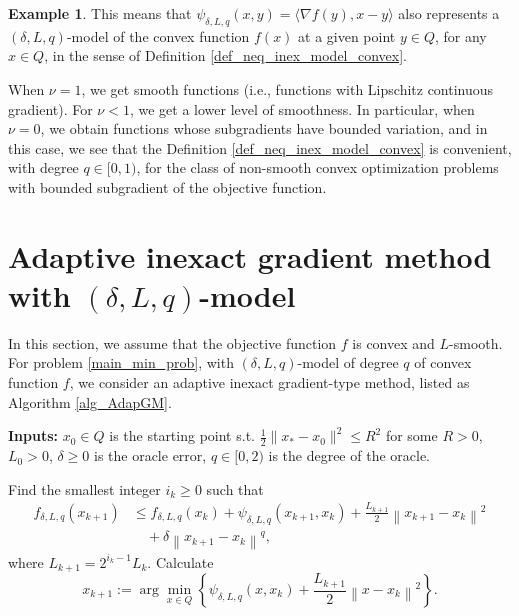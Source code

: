 \documentclass[11pt]{amsart}
\theoremstyle{definition}
\newtheorem{example}[theorem]{Example}
\numberwithin{equation}{section}
\begin{document}
\begin{example}
This means that $\psi_{\delta, L, q} (x,y) =\langle \nabla f(y), x - y \rangle $ also represents a $(\delta, L, q)$-model of the convex function $f(x)$ at a given point $y \in Q$, for any $x \in Q$,  in the sense of Definition \ref{def_neq_inex_model_convex}.

When $\nu = 1$, we get smooth functions (i.e., functions with Lipschitz continuous gradient). For $ \nu < 1$, we get a lower level of smoothness. In particular, when $ \nu = 0$, we obtain functions whose subgradients have bounded variation, and in this case, we see that the Definition \ref{def_neq_inex_model_convex} is convenient, with degree $q \in [0, 1)$, for the class of non-smooth convex optimization problems with bounded subgradient of the objective function. 
\end{example}


\section{Adaptive inexact gradient method with $(\delta, L, q)$-model}\label{sect_adaptiveGM}

In this section, we assume that the objective function $f$ is convex and $L$-smooth. For problem \eqref{main_min_prob}, with $(\delta, L,q)$-model of degree $q$ of convex function $f$, we consider an adaptive inexact gradient-type method, listed as Algorithm \ref{alg_AdapGM}.

\begin{algorithm}[H]
\caption{Adaptive inexact gradient method with $(\delta, L, q)$-model. }
\label{alg_AdapGM}
\textbf{Inputs:} $x_0 \in Q$ is the starting point s.t. $\frac{1}{2}\|x_* - x_0\|^2 \leq R^2$  for some $R>0$,  $L_0 > 0$, $\delta \geq 0$ is the oracle error, $q \in [0, 2)$ is the degree of the oracle.
\hspace*{\algorithmicindent}
\begin{algorithmic}[1]
\STATE Find the smallest integer $i_k\geq 0$ such that
\begin{align}\label{exitLDL_G_S}
    f_{\delta, L, q}(x_{k+1}) & \leq f_{\delta,L, q}(x_{k}) + \psi_{\delta, L,q}(x_{k+1}, x_{k}) + \frac{L_{k+1}}{2} \left \|x_{k+1} - x_k \right\|^2 
    \\& \quad + \delta \left\|x_{k+1} - x_k \right\|^q, \nonumber
\end{align}
where $L_{k+1} = 2^{i_k-1}L_k$.
\STATE Calculate
\begin{equation}\label{equmir2DL_G_S}
    x_{k+1} := {\arg\min_{x \in Q}}\left\{\psi_{\delta , L,q}(x, x_k)  +  \frac{L_{k+1}}{2} \left\|x -  x_k\right \|^2   \right\}.
\end{equation}
\ENDFOR
\end{algorithmic}
\end{algorithm}
\end{document}
